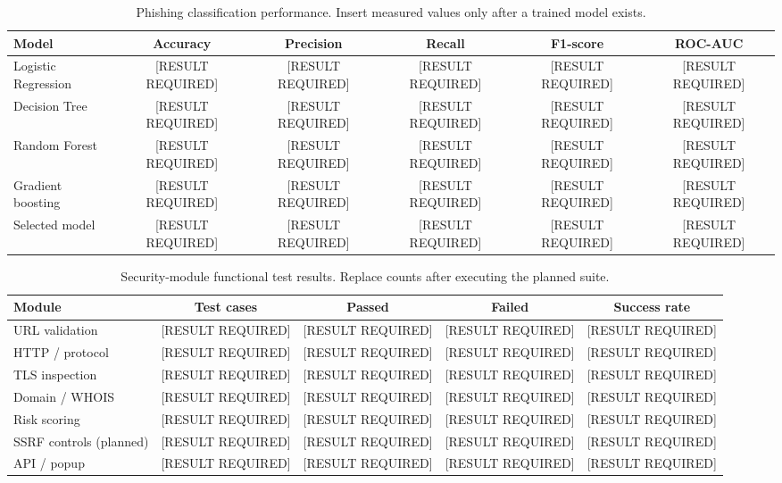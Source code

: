 \begin{table}[!t]
\centering
\caption{Phishing classification performance.
Insert measured values only after a trained model exists.}
\label{tab:ml-results}
\begin{tabular}{lccccc}
\toprule
Model & Accuracy & Precision & Recall & F1-score & ROC-AUC \\
\midrule
Logistic Regression & [RESULT REQUIRED] & [RESULT REQUIRED] & [RESULT REQUIRED] & [RESULT REQUIRED] & [RESULT REQUIRED] \\
Decision Tree & [RESULT REQUIRED] & [RESULT REQUIRED] & [RESULT REQUIRED] & [RESULT REQUIRED] & [RESULT REQUIRED] \\
Random Forest & [RESULT REQUIRED] & [RESULT REQUIRED] & [RESULT REQUIRED] & [RESULT REQUIRED] & [RESULT REQUIRED] \\
Gradient boosting & [RESULT REQUIRED] & [RESULT REQUIRED] & [RESULT REQUIRED] & [RESULT REQUIRED] & [RESULT REQUIRED] \\
Selected model & [RESULT REQUIRED] & [RESULT REQUIRED] & [RESULT REQUIRED] & [RESULT REQUIRED] & [RESULT REQUIRED] \\
\bottomrule
\end{tabular}
\end{table}

\begin{table}[!t]
\centering
\caption{Security-module functional test results.
Replace counts after executing the planned suite.}
\label{tab:module-tests}
\begin{tabular}{lcccc}
\toprule
Module & Test cases & Passed & Failed & Success rate \\
\midrule
URL validation & [RESULT REQUIRED] & [RESULT REQUIRED] & [RESULT REQUIRED] & [RESULT REQUIRED] \\
HTTP / protocol & [RESULT REQUIRED] & [RESULT REQUIRED] & [RESULT REQUIRED] & [RESULT REQUIRED] \\
TLS inspection & [RESULT REQUIRED] & [RESULT REQUIRED] & [RESULT REQUIRED] & [RESULT REQUIRED] \\
Domain / WHOIS & [RESULT REQUIRED] & [RESULT REQUIRED] & [RESULT REQUIRED] & [RESULT REQUIRED] \\
Risk scoring & [RESULT REQUIRED] & [RESULT REQUIRED] & [RESULT REQUIRED] & [RESULT REQUIRED] \\
SSRF controls (planned) & [RESULT REQUIRED] & [RESULT REQUIRED] & [RESULT REQUIRED] & [RESULT REQUIRED] \\
API / popup & [RESULT REQUIRED] & [RESULT REQUIRED] & [RESULT REQUIRED] & [RESULT REQUIRED] \\
\bottomrule
\end{tabular}
\end{table}

